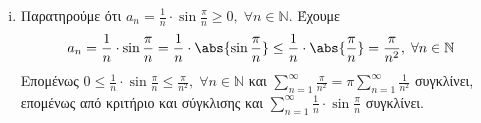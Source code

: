 \documentclass[a4paper,table]{report}
\begin{document}
\begin{enumerate}
\begin{enumerate}[i)]
      \item Παρατηρούμε ότι $ a_{n}= \frac{1}{n} \cdot \sin{\frac{\pi}{n}} \geq 0, 
        \; \forall n \in \mathbb{N}$. Έχουμε 
        \[
          a_{n} = \frac{1}{n} \cdot \sin{\frac{\pi}{n}} = \frac{1}{n} 
          \cdot \abs{\sin{\frac{\pi}{n}}} \leq \frac{1}{n} \cdot 
          \abs{\frac{\pi}{n}} = \frac{\pi}{n^{2}}, \; \forall n \in \mathbb{N} 
        \] 
        Επομένως $ 0 \leq \frac{1}{n} \cdot \sin{\frac{\pi}{n}} \leq 
        \frac{\pi}{n^{2}}, \; \forall n \in \mathbb{N}$ και $ \sum_{n=1}^{\infty} 
        \frac{\pi}{n^{2}} = \pi \sum_{n=1}^{\infty} \frac{1}{n^{2}}$ συγκλίνει, 
        επομένως από κριτήριο και σύγκλισης και $ \sum_{n=1}^{\infty} 
        \frac{1}{n} \cdot \sin{\frac{\pi}{n}}$ συγκλίνει.
    \end{enumerate}
\end{enumerate}
\end{document}
